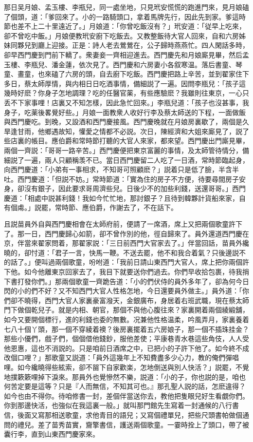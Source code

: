 那日吴月娘、孟玉樓、李瓶兒，同一處坐地，只見玳安慌慌的跑進門來，見月娘磕了個頭，道：「爹回來了。小的一路騎頭口，拿着馬牌先行，因此先到家。爹這時節也差不上二十里遠近了。」月娘道：「你曾吃飯沒有？」玳安道：「従早上吃來，卻不曾吃中飯。」月娘便教玳安廚下吃飯去。又教整飯待大官人回來，自和六房姊妹同夥兒到廳上迎接。正是：詩人老去鶯鶯在，公子歸時燕燕忙。四人閑話多時，卻早西門慶到門前下轎了。衆妻妾一齊相迎進去。西門慶先和月娘廝見畢，然后孟玉樓、李瓶兒、潘金蓮，依次見了。西門慶和六房妻小各叙寒温。落后書童、琴童、畫童，也來磕了六房的頭，自去廚下吃飯。西門慶把路上辛苦，並到翟家住下多日，蔡太師厚情，與内相日日吃酒事情，備細説了一遍。因問李瓶兒：「孩子這幾時好麽？你身子怎地調理？吃的任醫官薬，有些應驗麽？我雖則往東京，一心只丢不下家事哩！店裏又不知怎樣，因此急忙回來。」李瓶兒道：「孩子也沒甚事，我身子，吃薬後畧覺好些。」月娘一面教衆人收好行李及蔡太師送的下程，一面做飯與西門慶吃。到晚，又設酒和西門慶接風。西門慶晚就在月娘房裏歇了，兩個是久旱逢甘雨，他鄉遇故知，懽愛之情都不必説。次日，陳經濟和大姐來廝見了，説了些店裏的帳目。應伯爵和常時節打聽的大官人來家，都來望。西門慶出門廝見畢，兩個一齊説：「哥哥一路辛苦。」西門慶便把東京富麗的事情，及太師管待情分，備細説了一遍，兩人只顧稱羡不已。當日西門慶留二人吃了一日酒，常時節臨起身，向西門慶道：「小弟有一事相求，不知哥可照顧麽？」説着只是低了臉，半含半吐。西門慶道：「但説不妨。」常時節道：「實為住的房子不方便，待要尋間房子安身，卻沒有銀子，因此要求哥周濟些兒。日後少不的加些利錢，送還哥哥。」西門慶道：「相處中説甚利錢！我如今忙忙地，那討銀子？且待到韓夥計貨船來家，自有個䖏。」説罷，常時節、應伯爵，作謝去了，不在話下。

且説苗員外自與西門慶相會在太師府前，便請了一席酒，席上又把兩個歌童許下了。那一日，西門慶歸心如箭，卻不曾作別的他，徑自歸來了。員外還道西門慶在京，伴當來翟家問着，那翟家説：「三日前西門大官家去了。」伴當回話，苗員外纔曉的，卻忖道：「君子一言，快馬一鞭。不送去罷，他不和我合着氣？只後邊説不的話了。」便叫過兩個歌童，吩咐道：「我前日請山東西門大官人，席上把你兩個許下他。如今他離東京回家去了，我目下就要送你們過去。你們早收拾包裹，待我捎下書打發你們。」那兩個歌童一齊跪告道：「小的們伏侍的員外多年了，卻為何今日閃的小的們不好？又不知西門大官人性格怎地，今日還要員外做主。」員外道：「你們卻不曉得，西門大官人家裏豪富潑天，金銀廣布，身居着右班武職，現在蔡太師門下做個乾兒子。就是内相、朝官，那個不與他心腹往來？家裏開着兩個綾緞舖，如今又要開個標行，進的利錢也委的無數。况兼他性格温柔，吟風弄月，家裏養着七八十個丫頭，那一個不穿綾着襖？後房裏擺着五六房娘子，那一個不插珠挂金？那些小優們，戲子們，個個借他錢鈔，服他差使；平康巷青水巷這些角伎，人人受他恩惠，這也不消説的。只是咱前日酒席之中，已把小的子許下他了。如今終不成改個口哩？」那歌童又説道：「員外這幾年上不知費盡多少心力，教的俺們彈唱哩。如今纔曉得些絃索，卻不㽞下自家歡楽，怎地倒送與別人快活？」説罷，不覺地撲簌簌哩掉下淚來。那員外也覺慘然不樂，説道：「小的子，你也説的是，咱也何苦定要是這等？只是『人而無信，不知其可也。』那孔聖人説的話，怎麽違得？如今也由不得你。待咱修書一封，差個伴當送你去，教他把隻眼兒好生看覷你們。你到那邊快活，也強似在我這裏一般。」就叫那門館先生寫着一封通候的八行書信，後面又寫那相送歌童，求他青目的語兒；又寫個禮單兒，把些尺頭書帕做個通問的禮兒。差了苗秀苗實，齎擎書信，護送兩個歌童。一霎時拴上了頭口，帶了被囊行李，直到山東西門慶家來。

